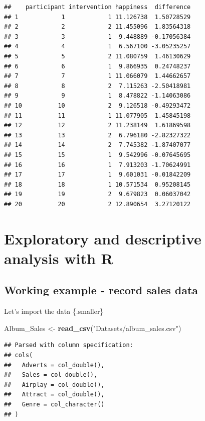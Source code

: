 \documentclass[
]{book}
\newenvironment{Shaded}{\begin{snugshade}}{\end{snugshade}}
\newcommand{\KeywordTok}[1]{\textcolor[rgb]{0.13,0.29,0.53}{\textbf{#1}}}
\newcommand{\NormalTok}[1]{#1}
\newcommand{\StringTok}[1]{\textcolor[rgb]{0.31,0.60,0.02}{#1}}
\begin{document}
\begin{verbatim}
##    participant intervention happiness  difference
## 1            1            1 11.126738  1.50728529
## 2            2            2 11.455096  1.83564318
## 3            3            1  9.448889 -0.17056384
## 4            4            1  6.567100 -3.05235257
## 5            5            2 11.080759  1.46130629
## 6            6            1  9.866935  0.24748237
## 7            7            1 11.066079  1.44662657
## 8            8            2  7.115263 -2.50418981
## 9            9            1  8.478822 -1.14063086
## 10          10            2  9.126518 -0.49293472
## 11          11            1 11.077905  1.45845198
## 12          12            2 11.238149  1.61869598
## 13          13            2  6.796180 -2.82327322
## 14          14            2  7.745382 -1.87407077
## 15          15            1  9.542996 -0.07645695
## 16          16            1  7.913203 -1.70624991
## 17          17            1  9.601031 -0.01842209
## 18          18            1 10.571534  0.95208145
## 19          19            2  9.679823  0.06037042
## 20          20            2 12.890654  3.27120122
\end{verbatim}

\hypertarget{exploratory-and-descriptive-analysis-with-r}{%
\chapter{Exploratory and descriptive analysis with R}\label{exploratory-and-descriptive-analysis-with-r}}

\hypertarget{working-example---record-sales-data}{%
\section{Working example - record sales data}\label{working-example---record-sales-data}}

Let's import the data \{.smaller\}

\begin{Shaded}
\begin{Highlighting}[]
\NormalTok{Album_Sales <-}\StringTok{ }\KeywordTok{read_csv}\NormalTok{(}\StringTok{"Datasets/album_sales.csv"}\NormalTok{)}
\end{Highlighting}
\end{Shaded}

\begin{verbatim}
## Parsed with column specification:
## cols(
##   Adverts = col_double(),
##   Sales = col_double(),
##   Airplay = col_double(),
##   Attract = col_double(),
##   Genre = col_character()
## )
\end{verbatim}
\end{document}
